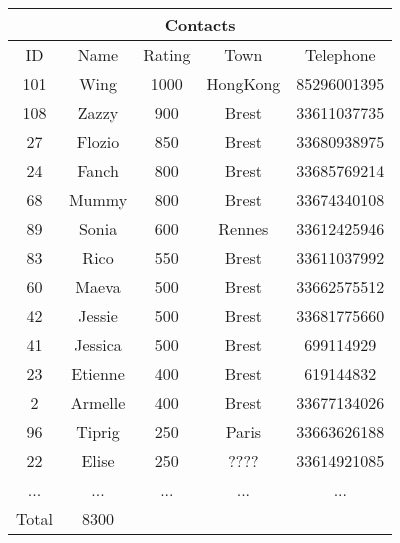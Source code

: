 \begin{longtable}{|c|c|c|c|c|}
\hline
\multicolumn{5}{|c|}{Contacts} \\
\hline
ID & Name & Rating & Town & Telephone\\
\hline
101 & Wing & 1000 & HongKong & 85296001395\\
\hline
108 & Zazzy & 900 & Brest & 33611037735\\
\hline
27 & Flozio & 850 & Brest & 33680938975\\
\hline
24 & Fanch & 800 & Brest & 33685769214\\
\hline
68 & Mummy & 800 & Brest & 33674340108\\
\hline
89 & Sonia & 600 & Rennes & 33612425946\\
\hline
83 & Rico & 550 & Brest & 33611037992\\
\hline
60 & Maeva & 500 & Brest & 33662575512\\
\hline
42 & Jessie & 500 & Brest & 33681775660\\
\hline
41 & Jessica & 500 & Brest & 699114929\\
\hline
23 & Etienne & 400 & Brest & 619144832\\
\hline
2 & Armelle & 400 & Brest & 33677134026\\
\hline
96 & Tiprig & 250 & Paris & 33663626188\\
\hline
22 & Elise & 250 & ???? & 33614921085\\
\hline
 ... & ... & ... & ... & ... \\
\hline
Total & 8300 &  & & \\
\hline
\end{longtable}
